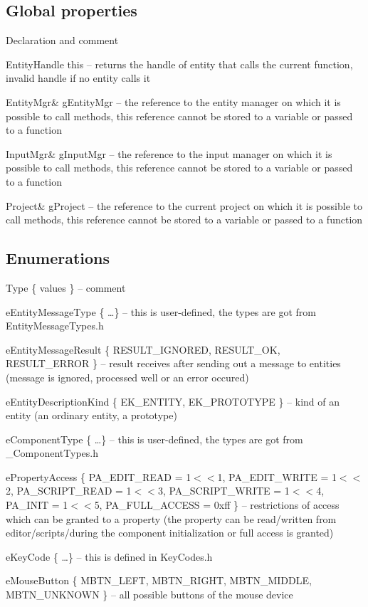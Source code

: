 \subsection{Global properties}

\begin{titled-itemize}{Declaration and comment}
  \item EntityHandle this -- returns the handle of entity that calls the current function, invalid handle if no entity calls it
  \item EntityMgr\& gEntityMgr -- the reference to the entity manager on which it is possible to call methods, this reference cannot be stored to a variable or passed to a function
  \item InputMgr\& gInputMgr -- the reference to the input manager on which it is possible to call methods, this reference cannot be stored to a variable or passed to a function
  \item Project\& gProject -- the reference to the current project on which it is possible to call methods, this reference cannot be stored to a variable or passed to a function
\end{titled-itemize}

\subsection{Enumerations}

\begin{titled-itemize}{Type \{ values \} -- comment}
  \item eEntityMessageType \{ \ldots \} -- this is user-defined, the types are got from EntityMessageTypes.h
  \item eEntityMessageResult \{ RESULT\_IGNORED, RESULT\_OK, RE\-SULT\-\_\-ER\-ROR \} -- result receives after sending out a message to entities (message is ignored, processed well or an error occured)
  \item eEntityDescriptionKind \{ EK\_ENTITY, EK\_PROTOTYPE \} -- kind of an entity (an ordinary entity, a prototype)
  \item eComponentType \{ \ldots \} -- this is user-defined, the types are got from \_ComponentTypes.h 
  \item ePropertyAccess \{ PA\_EDIT\_READ = 1$<<$1, PA\_EDIT\_WRITE = 1$<<$2, PA\_SCRIPT\_READ = 1$<<$3, PA\_SCRIPT\_WRITE = 1$<<$4, PA\_INIT = 1$<<$5, PA\_FULL\_ACCESS = 0xff \} -- restrictions of access which can be granted to a property (the property can be read/written from editor/scripts/during the component initialization or full access is granted)
  \item eKeyCode \{ \ldots \} -- this is defined in KeyCodes.h
  \item eMouseButton \{ MBTN\_LEFT, MBTN\_RIGHT, MBTN\_MIDDLE, \\MBTN\_UNKNOWN \} -- all possible buttons of the mouse device
\end{titled-itemize}

